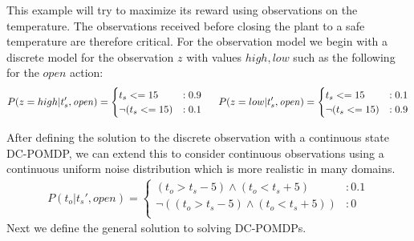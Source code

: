 \documentclass{article} %
\newcommand{\open}{\mathit{open}}
\newcommand{\close}{\mathit{close}}
\begin{document}
This example will try to maximize its reward using observations on the temperature. The observations received before closing the plant to a safe temperature are therefore critical.  For the observation model we begin with a discrete model for the observation $z$ with values $high, low$ such as the following for the $\open$ action:  
{\footnotesize
\vspace{-1mm}
\begin{align}
P(z=high|t_s',\open) = 
\begin{cases}
  t_s <= 15 &: 0.9 \\
 \neg (t_s <= 15)&: 0.1 \\
\end{cases}
\hspace{5mm}
P(z=low|t_s',\open) = 
\begin{cases}
 t_s <= 15 &: 0.1 \\
 \neg (t_s <= 15) &: 0.9 \\
\end{cases}
\end{align}
\vspace{-3mm}
}

After defining the solution to the discrete observation with a continuous state DC-POMDP, we can extend this to consider continuous observations using a continuous uniform noise distribution which is more realistic in many domains. %
{\footnotesize
\begin{align}
P(t_o|t_s',\open) = 
\begin{cases}
 (t_o>t_s-5) \wedge (t_o<t_s+5) &: 0.1 \\
 \neg((t_o>t_s-5) \wedge (t_o<t_s+5)) &: 0 \\
\end{cases}
\end{align}
}
Next we define the general solution to solving DC-POMDPs. 
\end{document}
